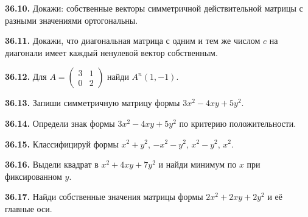 \noindent\begin{minipage}[t]{\linewidth}\textbf{36.10.} Докажи: собственные векторы симметричной действительной матрицы с разными значениями ортогональны.\par\end{minipage}\par
\noindent\begin{minipage}[t]{\linewidth}\textbf{36.11.} Докажи, что диагональная матрица с одним и тем же числом \(c\) на диагонали имеет каждый ненулевой вектор собственным.\par\end{minipage}\par
\noindent\begin{minipage}[t]{\linewidth}\textbf{36.12.}\starmark{} Для \(A=\begin{pmatrix}3&1\\0&2\end{pmatrix}\) найди \(A^n(1,-1)\).\par\end{minipage}\par
\noindent\begin{minipage}[t]{\linewidth}\textbf{36.13.} Запиши симметричную матрицу формы \(3x^2-4xy+5y^2\).\par\end{minipage}\par
\noindent\begin{minipage}[t]{\linewidth}\textbf{36.14.} Определи знак формы \(3x^2-4xy+5y^2\) по критерию положительности.\par\end{minipage}\par
\noindent\begin{minipage}[t]{\linewidth}\textbf{36.15.} Классифицируй формы \(x^2+y^2\), \(-x^2-y^2\), \(x^2-y^2\), \(x^2\).\par\end{minipage}\par
\noindent\begin{minipage}[t]{\linewidth}\textbf{36.16.} Выдели квадрат в \(x^2+4xy+7y^2\) и найди минимум по \(x\) при фиксированном \(y\).\par\end{minipage}\par
\noindent\begin{minipage}[t]{\linewidth}\textbf{36.17.} Найди собственные значения матрицы формы \(2x^2+2xy+2y^2\) и её главные оси.\par\end{minipage}\par

